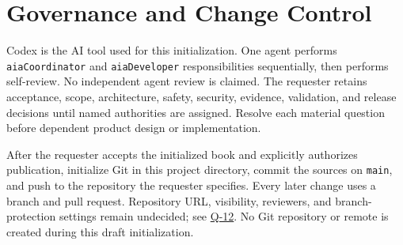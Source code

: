 \section{Governance and Change Control}
\label{Section:ProjectChangeControl}
Codex is the AI tool used for this initialization. One agent performs
\texttt{aiaCoordinator} and \texttt{aiaDeveloper} responsibilities sequentially,
then performs self-review. No independent agent review is claimed.
The requester retains acceptance, scope, architecture, safety, security,
evidence, validation, and release decisions until named authorities are assigned.
Resolve each material question before dependent product design or implementation.

After the requester accepts the initialized book and explicitly authorizes
publication, initialize Git in this project directory, commit the sources on
\texttt{main}, and push to the repository the requester specifies.
Every later change uses a branch and pull request. Repository URL, visibility,
reviewers, and branch-protection settings remain undecided; see
\hyperref[Question:Q-12]{Q-12}. No Git repository or remote is created during
this draft initialization.

